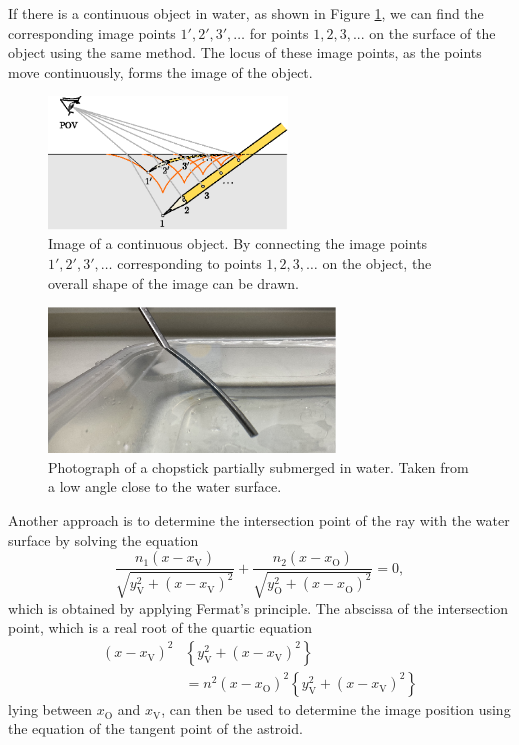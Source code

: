 \documentclass[twocolumn]{article}
\begin{document}
If there is a continuous object in water, as shown in Figure \ref{fig:extended_image}, we can find the corresponding image points $1', 2', 3', \dots$ for points $1, 2, 3, ...$ on the surface of the object using the same method. The locus of these image points, as the points move continuously, forms the image of the object.

\begin{figure}[h]
	\centering
	\includegraphics*[width=2.5in]{figs/g242.eps}
	\caption{Image of a continuous object. By connecting the image points $1', 2', 3', \dots$ corresponding to points $1, 2, 3, \dots$ on the object, the overall shape of the image can be drawn.}
	\label{fig:extended_image}
\end{figure}

\begin{figure}[h]
	\centering
	\includegraphics[width=3in]{figs/img_1805_2.eps}
	\caption{Photograph of a chopstick partially submerged in water. Taken from a low angle close to the water surface.}
	\label{fig:picture}
\end{figure}

Another approach is to determine the intersection point of the ray with the water surface by solving the equation
\[
\dfrac{n_1 \left( x - x_{\mathrm{V}}^{} \right)}{\sqrt{ y_{\mathrm{V}}^2 + \left( x - x_{\mathrm{V}}^{} \right)^2 }}
+\dfrac{n_2 \left( x - x_{\mathrm{O}}^{} \right)}{\sqrt{ y_{\mathrm{O}}^2 + \left( x - x_{\mathrm{O}}^{} \right)^2 }}
= 0,
\]
which is obtained by applying Fermat's principle. The abscissa of the intersection point, which is a real root of the quartic equation
\[ \begin{aligned}
	\left( x - x_{\mathrm{V}}^{} \right)^2 &\left\{ y_{\mathrm{V}}^2 + \left(x - x_{\mathrm{V}}^{} \right)^2 \right\} \\
	&= n^2 \left( x - x_{\mathrm{O}}^{} \right)^2 \left\{ y_{\mathrm{V}}^2 + \left(x - x_{\mathrm{V}}^{} \right)^2 \right\}
	\end{aligned}
\]
lying between $x_{\mathrm{O}}^{}$ and $x_{\mathrm{V}}^{}$, can then be used to determine the image position using the equation of the tangent point of the astroid.
\end{document}
